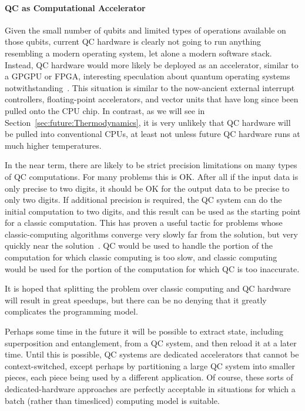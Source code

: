 \paragraph{QC as Computational Accelerator}

Given the small number of qubits and limited types of operations available
on those qubits, current QC hardware is clearly not going to run anything
resembling a modern operating system, let alone a modern software stack.
Instead, QC hardware would more likely be deployed as an accelerator,
similar to a GPGPU or FPGA,
interesting speculation about quantum operating systems
notwithstanding~\cite{HenryCorriganGibbs2017QCOS}.
This situation is similar to the now-ancient external interrupt
controllers, floating-point accelerators, and vector units that have
long since been pulled onto the CPU chip.
In contrast, as we will see in Section~\ref{sec:future:Thermodynamics}, 
it is very unlikely that QC hardware will be pulled into conventional
CPUs, at least not unless future QC hardware runs at much higher
temperatures.

In the near term, there are likely to be strict precision limitations
on many types of QC computations.
For many problems this is OK.
After all if the input data is only precise to two digits, it should
be OK for the output data to be precise to only two digits.
If additional precision is required, the QC system can do the
initial computation to two digits, and this result can be used
as the starting point for a classic computation.
This has proven a useful tactic for problems whose classic-computing
algorithms converge very slowly far from the solution, but very
quickly near the solution~\cite{JakubKurzak2007MixedPrecision}.
QC would be used to handle the portion of the computation for which
classic computing is too slow, and classic computing would be used
for the portion of the computation for which QC is too inaccurate.

It is hoped that splitting the problem over classic computing and
QC hardware will result in great speedups, but there can be no denying
that it greatly complicates the programming model.

Perhaps some time in the future it will be possible to extract
state, including superposition and entanglement, from a QC system,
and then reload it at a later time.
Until this is possible, QC systems are dedicated accelerators
that cannot be context-switched, except perhaps by partitioning
a large QC system into smaller pieces, each piece being used by
a different application.
Of course, these sorts of dedicated-hardware approaches are perfectly
acceptable in situations for which a batch (rather than timesliced)
computing model is suitable.

